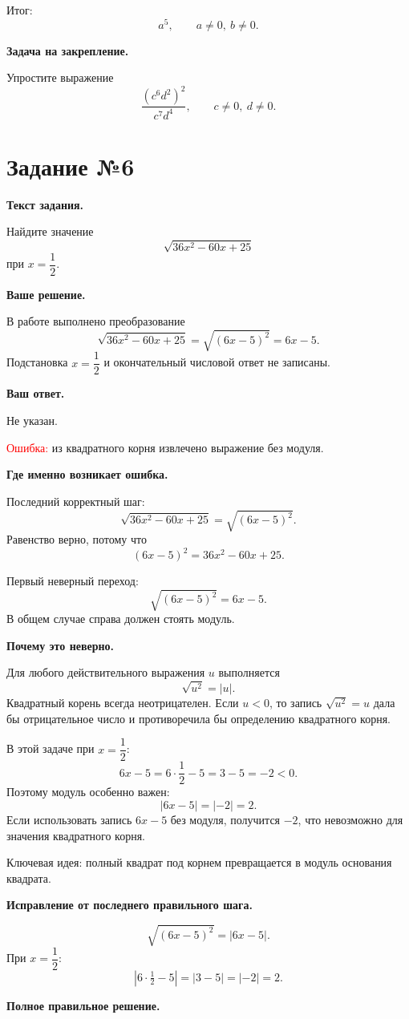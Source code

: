 \documentclass[12pt,a4paper]{article}
\begin{document}
\textcolor{teal!60!black}{Итог:}
\[
\boxed{a^5},\qquad a\ne0,\ b\ne0.
\]

\textbf{Задача на закрепление.}

Упростите выражение
\[
\frac{(c^6d^2)^2}{c^7d^4},\qquad c\ne0,\ d\ne0.
\]

\newpage
{}
\label{task:6}
\section*{Задание №6}

\textbf{Текст задания.}

Найдите значение
\[
\sqrt{36x^2-60x+25}
\]
при $x=\dfrac12$.

\textbf{Ваше решение.}

В работе выполнено преобразование
\[
\sqrt{36x^2-60x+25}
=
\sqrt{(6x-5)^2}
=
6x-5.
\]
Подстановка $x=\dfrac12$ и окончательный числовой ответ не записаны.

\textbf{Ваш ответ.}

Не указан.

\textcolor{red}{Ошибка:} из квадратного корня извлечено выражение без модуля.

\textbf{Где именно возникает ошибка.}

Последний корректный шаг:
\[
\sqrt{36x^2-60x+25}
=
\sqrt{(6x-5)^2}.
\]
Равенство верно, потому что
\[
(6x-5)^2=36x^2-60x+25.
\]

Первый неверный переход:
\[
\sqrt{(6x-5)^2}=6x-5.
\]
В общем случае справа должен стоять модуль.

\textbf{Почему это неверно.}

Для любого действительного выражения $u$ выполняется
\[
\sqrt{u^2}=|u|.
\]
Квадратный корень всегда неотрицателен. Если $u<0$, то запись $\sqrt{u^2}=u$ дала бы отрицательное число и противоречила бы определению квадратного корня.

В этой задаче при $x=\dfrac12$:
\[
6x-5=6\cdot\frac12-5=3-5=-2<0.
\]
Поэтому модуль особенно важен:
\[
|6x-5|=|-2|=2.
\]
Если использовать запись $6x-5$ без модуля, получится $-2$, что невозможно для значения квадратного корня.

\textcolor{blue!60!black}{Ключевая идея:} полный квадрат под корнем превращается в модуль основания квадрата.

\textbf{Исправление от последнего правильного шага.}

\[
\sqrt{(6x-5)^2}=|6x-5|.
\]
При $x=\dfrac12$:
\[
|6\cdot\tfrac12-5|
=
|3-5|
=
|-2|
=
2.
\]

\textbf{Полное правильное решение.}
\end{document}
